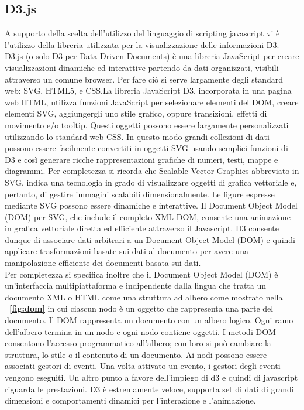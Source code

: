 {\subsection{D3.js}
A supporto della scelta dell'utilizzo del linguaggio di scripting javascript vi è l'utilizzo della libreria utilizzata per la visualizzazione delle informazioni D3.
D3.js (o solo D3 per Data-Driven Documents) è una libreria JavaScript per creare visualizzazioni dinamiche ed interattive partendo da dati organizzati, visibili attraverso un comune browser. Per fare ciò si serve largamente degli standard web: SVG, HTML5, e CSS.La libreria JavaScript D3, incorporata in una pagina web HTML, utilizza funzioni JavaScript per selezionare elementi del DOM, creare elementi SVG, aggiungergli uno stile grafico, oppure transizioni, effetti di movimento e/o tooltip. Questi oggetti possono essere largamente personalizzati utilizzando lo standard web CSS. In questo modo grandi collezioni di dati possono essere facilmente convertiti in oggetti SVG usando semplici funzioni di D3 e così generare ricche rappresentazioni grafiche di numeri, testi, mappe e diagrammi. 
Per completezza si ricorda che Scalable Vector Graphics abbreviato in SVG, indica una tecnologia in grado di visualizzare oggetti di grafica vettoriale e, pertanto, di gestire immagini scalabili dimensionalmente. 
Le figure espresse mediante SVG possono essere dinamiche e interattive. Il Document Object Model (DOM) per SVG, che include il completo XML DOM, consente una animazione in grafica vettoriale diretta ed efficiente attraverso il Javascript.
D3 consente dunque di associare dati arbitrari a un Document Object Model (DOM) e quindi applicare trasformazioni basate sui dati al documento per avere una manipolazione efficiente dei documenti basata sui dati. \\
Per completezza si specifica inoltre che il Document Object Model (DOM) è un'interfaccia multipiattaforma e indipendente dalla lingua che tratta un documento XML o HTML come una struttura ad albero come mostrato nella \textbf{\figurename~\ref{fig:dom}}   in cui ciascun nodo è un oggetto che rappresenta una parte del documento. Il DOM rappresenta un documento con un albero logico. Ogni ramo dell'albero termina in un nodo e ogni nodo contiene oggetti. I metodi DOM consentono l'accesso programmatico all'albero; con loro si può cambiare la struttura, lo stile o il contenuto di un documento. Ai nodi possono essere associati gestori di eventi. Una volta attivato un evento, i gestori degli eventi vengono eseguiti.
Un altro punto a favore dell'impiego di d3 e quindi di javascript riguarda le prestazioni. D3 è estremamente veloce, supporta set di dati di grandi dimensioni e comportamenti dinamici per l'interazione e l'animazione.
}
